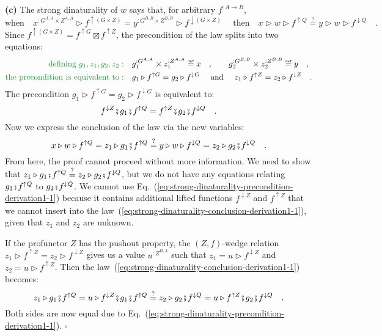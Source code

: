 \textbf{(c)} The strong dinaturality of $w$ says that, for arbitrary
$f^{:A\rightarrow B}$,
\[
\text{when}\quad x^{:G^{A,A}\times Z^{A,A}}\triangleright f^{\uparrow(G\times Z)}=y^{:G^{B,B}\times Z^{B,B}}\triangleright f^{\downarrow(G\times Z)}\quad\text{ then}\quad x\triangleright w\triangleright f^{\uparrow Q}\overset{?}{=}y\triangleright w\triangleright f^{\downarrow Q}\quad.
\]
Since $f^{\uparrow(G\times Z)}=f^{\uparrow G}\boxtimes f^{\uparrow Z}$,
the precondition of the law splits into two equations:
\begin{align*}
{\color{greenunder}\text{defining }g_{1},z_{1},g_{2},z_{2}:}\quad & g_{1}^{:G^{A,A}}\times z_{1}^{:Z^{A,A}}\triangleq x\quad,\quad\quad g_{2}^{:G^{B,B}}\times z_{2}^{:Z^{B,B}}\triangleq y\quad,\\
{\color{greenunder}\text{the precondition is equivalent to}:}\quad & g_{1}\triangleright f^{\uparrow G}=g_{2}\triangleright f^{\downarrow G}\quad\text{ and }\quad z_{1}\triangleright f^{\uparrow Z}=z_{2}\triangleright f^{\downarrow Z}\quad.
\end{align*}
The precondition $g_{1}\triangleright f^{\uparrow G}=g_{2}\triangleright f^{\downarrow G}$
is equivalent to:
\begin{equation}
f^{\downarrow Z}\bef g_{1}\bef f^{\uparrow Q}=f^{\uparrow Z}\bef g_{2}\bef f^{\downarrow Q}\quad.\label{eq:strong-dinaturality-precondition-derivation1-1}
\end{equation}
Now we express the conclusion of the law via the new variables:
\begin{equation}
x\triangleright w\triangleright f^{\uparrow Q}=z_{1}\triangleright g_{1}\bef f^{\uparrow Q}\overset{?}{=}y\triangleright w\triangleright f^{\downarrow Q}=z_{2}\triangleright g_{2}\bef f^{\downarrow Q}\quad.\label{eq:strong-dinaturality-conclusion-derivation1-1}
\end{equation}
From here, the proof cannot proceed without more information. We need
to show that $z_{1}\triangleright g_{1}\bef f^{\uparrow Q}\overset{?}{=}z_{2}\triangleright g_{2}\bef f^{\downarrow Q}$,
but we do not have any equations relating $g_{1}\bef f^{\uparrow Q}$
to $g_{2}\bef f^{\downarrow Q}$. We cannot use Eq.~(\ref{eq:strong-dinaturality-precondition-derivation1-1})
because it contains additional lifted functions $f^{\downarrow Z}$
and $f^{\uparrow Z}$ that we cannot insert into the law~(\ref{eq:strong-dinaturality-conclusion-derivation1-1}),
given that $z_{1}$ and $z_{2}$ are unknown. 

If the profunctor $Z$ has the pushout property, the $\left(Z,f\right)$-wedge
relation $z_{1}\triangleright f^{\uparrow Z}=z_{2}\triangleright f^{\downarrow Z}$
gives us a value $u^{:Z^{B,A}}$ such that $z_{1}=u\triangleright f^{\downarrow Z}$
and $z_{2}=u\triangleright f^{\uparrow Z}$. Then the law~(\ref{eq:strong-dinaturality-conclusion-derivation1-1})
becomes:
\[
z_{1}\triangleright g_{1}\bef f^{\uparrow Q}=u\triangleright f^{\downarrow Z}\bef g_{1}\bef f^{\uparrow Q}\overset{?}{=}z_{2}\triangleright g_{2}\bef f^{\downarrow Q}=u\triangleright f^{\uparrow Z}\bef g_{2}\bef f^{\downarrow Q}\quad.
\]
Both sides are now equal due to Eq.~(\ref{eq:strong-dinaturality-precondition-derivation1-1}).
$\square$

